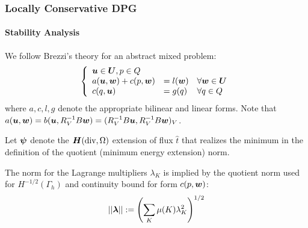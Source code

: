 \documentclass[18pt,xcolor=table]{beamer}
\begin{document}

\begin{frame}[noframenumbering]
\frametitle{Locally Conservative DPG}
\framesubtitle{Stability Analysis}
We follow Brezzi's theory for an abstract mixed problem:
\begin{equation*}
\left\{
\begin{array}{lll}
\boldsymbol u \in \boldsymbol U, p \in Q\\
a(\boldsymbol u,\boldsymbol w) + c(p,\boldsymbol w) & = l(\boldsymbol w) & \forall \boldsymbol w \in \boldsymbol U \\
c(q,\boldsymbol u) & = g(q) & \forall q \in Q
\end{array}
\right.
\end{equation*}
where $a,c,l,g$ denote the appropriate
bilinear and linear forms. Note that
$a(\boldsymbol u,\boldsymbol w)=b(\boldsymbol u,R_V^{-1}B\boldsymbol w)=(R_V^{-1}B\boldsymbol u,R_V^{-1}B\boldsymbol w)_V$.

Let $\boldsymbol\psi$ denote the $\mbox{\boldmath $H$}(\text{div},\Omega)$ extension of flux $\hat{t}$
that realizes the minimum in the definition of the quotient (minimum energy
extension) norm.

The norm for the Lagrange multipliers $\lambda_K$ is implied
by the quotient norm used for $H^{-1/2}(\Gamma_h)$ and continuity
bound for form $c(p,\boldsymbol w)$:
\[
||\boldsymbol\lambda||:=\left(\sum_K \mu(K) \lambda_K^2\right)^{1/2}
\]
\end{frame}
\end{document}
